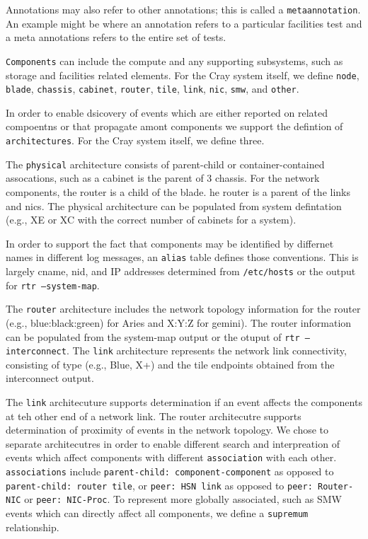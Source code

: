 Annotations may also refer to other annotations; this is called a \texttt{metaannotation}.
An example might be where an annotation refers to a particular facilities
test and a meta annotations refers to the entire set of tests.

\texttt{Components} can include the compute and any supporting subsystems,
such as storage and facilities related elements. For the Cray system
itself, we define \texttt{node}, \texttt{blade}, \texttt{chassis},
\texttt{cabinet}, \texttt{router}, \texttt{tile}, \texttt{link}, \texttt{nic},
\texttt{smw}, and \texttt{other}.

In order to enable dsicovery of events which are either reported on related
compoentns or that propagate amont components we support the defintion
of \texttt{architectures}. For the Cray system itself, we define three.

The \texttt{physical} architecture consists of parent-child or
container-contained assocations, such as a cabinet is the parent of
3 chassis. For the network components, the router is a child of the blade.
he router is a parent of the links and nics. The physical architecture
can be populated from system defintation (e.g., XE or XC with the
correct number of cabinets for a system).

In order to support the fact that components may be identified by differnet
names in different log messages, an \texttt{alias} table defines those conventions.
This is largely cname, nid, and IP addresses determined from \texttt{/etc/hosts}
or the output for \texttt{rtr --system-map}.

The \texttt{router} architecture includes the network topology information
for the router (e.g., blue:black:green)
for Aries and X:Y:Z for gemini). The router information can be populated from
the system-map output or the otuput of \texttt{rtr --interconnect}.
The \texttt{link} architecture represents the network link connectivity,
consisting of type (e.g., Blue, X+) and the tile endpoints obtained
from the interconnect output.

The \texttt{link} architecuture supports determination if an event affects the
components at teh other end of a network link. The router architecutre
supports determination of proximity of events in the network topology.
We chose to separate architecutres in order to enable different
search and interpreation of events which affect components with
different \texttt{association} with each other. \texttt{associations}
include \texttt{parent-child: component-component} as opposed to
\texttt{parent-child: router tile}, or \texttt{peer: HSN link}
as opposed to \texttt{peer: Router-NIC} or \texttt{peer: NIC-Proc}.
To represent more globally associated, such as SMW
events which can directly affect all components, we define
a \texttt{supremum} relationship.

